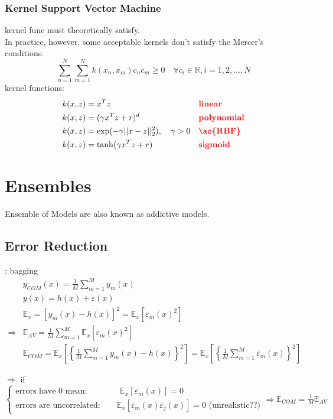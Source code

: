 \subsection{Kernel Support Vector Machine}
 kernel \ac{func} must theoretically satisfy.\\
In practice, however, some acceptable kernels don't satisfy the Mercer's conditions.
\begin{equation}
	\sum_{n=1}^N\sum_{m=1}^N k(x_n, x_m) c_n c_m \geq 0 \quad \forall c_i \in \mathbb{R}, i =1, 2, \dots, N
\end{equation}
\Eg kernel functions:
\begin{align*}
	&k(x,z) = x^T z && \hlr{linear}\\
	&k(x,z) = (\gamma x^T z + r)^d && \hlr{polynomial}\\
	&k(x,z) = \exp(-\gamma ||x-z||^2_2), \quad \gamma>0 && \hlr{\ac{RBF}}\\
	&k(x,z) = \tanh(\gamma x^T z + r) && \hlr{sigmoid}
\end{align*}

\chapter{Ensembles}
Ensemble of Models are also known as addictive models.

\section{Error Reduction}


\Eg: bagging
\begin{align}
	&y_{COM}(x) = \frac{1}{M} \sum_{m=1}^{M} y_m(x)\\
	&y(x) = h(x) + \varepsilon(x)\\
	&\mathbb{E}_x = \left[ y_m(x) - h(x) \right]^2 = \mathbb{E}_x \left[ \varepsilon_m(x)^2 \right]\\
	\Rightarrow &\mathbb{E}_{AV} = \frac{1}{M} \sum_{m=1}^{M} \mathbb{E}_x \left[ \varepsilon_m (x)^2 \right]\\
	&\mathbb{E}_{COM} = \mathbb{E}_x \left[ \left\{ \frac{1}{M} \sum_{m=1}^{M} y_m(x) - h(x) \right\}^2 \right] = \mathbb{E}_x \left[ \left\{ \frac{1}{M} \sum_{m=1}^{M} \varepsilon_m(x) \right\}^2 \right]
\end{align}

$\Rightarrow$ if $\begin{cases}
	\text{errors have 0 mean:} \qquad\qquad \mathbb{E}_x[\varepsilon_m(x)]=0\\
	\text{errors are uncorrelated:} \qquad \mathbb{E}_x[\varepsilon_m(x) \varepsilon_j(x)]=0 \text{ (unrealistic??)}
\end{cases} \Rightarrow \mathbb{E}_{COM} = \frac{1}{M} \mathbb{E}_{AV}$

